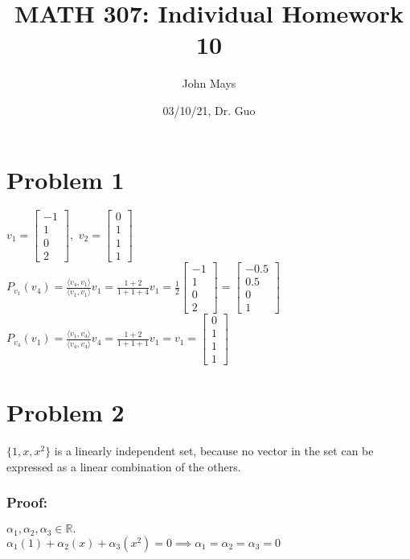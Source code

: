 \documentclass[fleqn]{article}
\title{\textbf{MATH 307: Individual Homework 10}}
\author{John Mays}
\date{03/10/21, Dr. Guo}
\begin{document}
\maketitle

\section*{Problem 1}
$v_1= \begin{bmatrix}-1\\1\\0\\2\end{bmatrix},$  $v_2= \begin{bmatrix}0\\1\\1\\1\end{bmatrix}$\\
$P_{v_1}(v_4)=\frac{\langle v_4, v_1 \rangle}{\langle v_1, v_1 \rangle}v_1=\frac{1+2}{1+1+4}v_1=\frac{1}{2}\begin{bmatrix}-1\\1\\0\\2\end{bmatrix}=\begin{bmatrix}-0.5\\ 0.5\\0\\1\end{bmatrix}$\\
$P_{v_4}(v_1)=\frac{\langle v_1, v_4 \rangle}{\langle v_4, v_4 \rangle}v_4=\frac{1+2}{1+1+1}v_1=v_1=\begin{bmatrix}0\\1\\1\\1\end{bmatrix}$

\section*{Problem 2}
$\{1,x,x^2\}$ is a linearly independent set, because no vector in the set can be expressed as a linear combination of the others.
\subsubsection*{Proof:}
$\alpha_1,\alpha_2,\alpha_3\in\mathbb{R}.$\\
$\alpha_1(1)+\alpha_2(x)+\alpha_3(x^2)=0 \implies \alpha_1=\alpha_2=\alpha_3=0$\\
\end{document}
